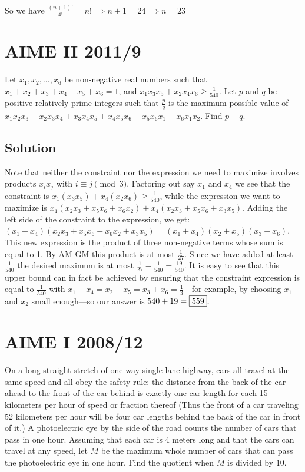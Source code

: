 \documentclass{article}
\begin{document}
So we have $\frac{(n+1)!}{4!} = n!$ $\Longrightarrow  n+1 = 24$ $\Longrightarrow  n = 23$
\pagebreak\section{AIME II 2011/9}
Let $x_1, x_2, ... , x_6$ be non-negative real numbers such that $x_1 +x_2 +x_3 +x_4 +x_5 +x_6 =1$, and $x_1 x_3 x_5 +x_2 x_4 x_6 \ge {\scriptstyle\frac{1}{540}}$. Let $p$ and $q$ be positive relatively prime integers such that $\frac{p}{q}$ is the maximum possible value of $x_1 x_2 x_3 + x_2 x_3 x_4 +x_3 x_4 x_5 +x_4 x_5 x_6 +x_5 x_6 x_1 +x_6 x_1 x_2$. Find $p+q$.
\subsection{Solution}
Note that neither the constraint nor the expression we need to maximize involves products $x_i x_j$ with $i \equiv j \pmod 3$. Factoring out say $x_1$ and $x_4$ we see that the constraint is $x_1(x_3x_5) + x_4(x_2x_6) \ge {\scriptstyle\frac1{540}}$, while the expression we want to maximize is $x_1(x_2x_3 + x_5x_6 + x_6x_2) + x_4(x_2x_3 + x_5x_6 + x_3x_5)$. Adding the left side of the constraint to the expression, we get: $(x_1 + x_4)(x_2x_3 + x_5x_6 + x_6x_2 + x_3x_5) = (x_1 + x_4)(x_2 + x_5)(x_3 + x_6)$. This new expression is the product of three non-negative terms whose sum is equal to 1. By AM-GM this product is at most $\scriptstyle\frac1{27}$. Since we have added at least $\scriptstyle\frac1{540}$ the desired maximum is at most $\scriptstyle\frac1{27} - \frac1{540} = \frac{19}{540}$. It is easy to see that this upper bound can in fact be achieved by ensuring that the constraint expression is equal to $\scriptstyle\frac1{540}$ with $x_1 + x_4 = x_2 + x_5 = x_3 + x_6 = \scriptstyle\frac13$—for example, by choosing $x_1$ and $x_2$ small enough—so our answer is $540 + 19 = \fbox{559}.$
\pagebreak\section{AIME I 2008/12}
On a long straight stretch of one-way single-lane highway, cars all travel at the same speed and all obey the safety rule: the distance from the back of the car ahead to the front of the car behind is exactly one car length for each 15 kilometers per hour of speed or fraction thereof (Thus the front of a car traveling 52 kilometers per hour will be four car lengths behind the back of the car in front of it.) A photoelectric eye by the side of the road counts the number of cars that pass in one hour. Assuming that each car is 4 meters long and that the cars can travel at any speed, let $M$ be the maximum whole number of cars that can pass the photoelectric eye in one hour. Find the quotient when $M$ is divided by $10$.
\end{document}
